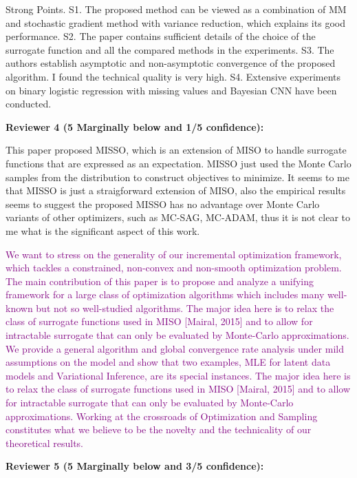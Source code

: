 \documentclass{article} %
\theoremstyle{t}
\begin{document}
Strong Points. S1. The proposed method can be viewed as a combination of MM and stochastic gradient method with variance reduction, which explains its good performance. S2. The paper contains sufficient details of the choice of the surrogate function and all the compared methods in the experiments. S3. The authors establish asymptotic and non-asymptotic convergence of the proposed algorithm. I found the technical quality is very high. S4. Extensive experiments on binary logistic regression with missing values and Bayesian CNN have been conducted.



\textbf{Reviewer 4 (5 Marginally below and 1/5 confidence):}

This paper proposed MISSO, which is an extension of MISO to handle surrogate functions that are expressed as an expectation. MISSO just used the Monte Carlo samples from the distribution to construct objectives to minimize.
It seems to me that MISSO is just a straigforward extension of MISO, also the empirical results seems to suggest the proposed MISSO has no advantage over Monte Carlo variants of other optimizers, such as MC-SAG, MC-ADAM, thus it is not clear to me what is the significant aspect of this work.

\textcolor{purple}{
We want to stress on the generality of our incremental optimization framework, which tackles a constrained, non-convex and non-smooth optimization problem. 
The main contribution of this paper is to propose and analyze a unifying framework for a large class of optimization algorithms which includes many well-known but not so well-studied algorithms.
The major idea here is to relax the class of surrogate functions used in MISO [Mairal, 2015] and to allow for intractable surrogate that can only be evaluated by Monte-Carlo approximations.
We provide a general algorithm and global convergence rate analysis under mild assumptions on the model and show that two examples, MLE for latent data models and Variational Inference, are its special instances.
The major idea here is to relax the class of surrogate functions used in MISO [Mairal, 2015] and to allow for intractable surrogate that can only be evaluated by Monte-Carlo approximations.
Working at the crossroads of Optimization and Sampling constitutes what we believe to be the novelty and the technicality of our theoretical results.
}



\textbf{Reviewer 5 (5 Marginally below and 3/5 confidence):}
\end{document}
